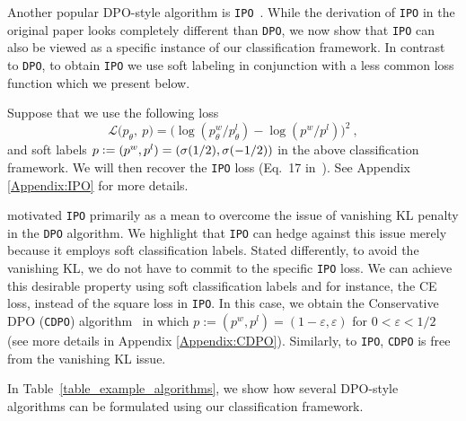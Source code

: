 Another popular DPO-style algorithm is \texttt{IPO}~\cite{IPO}. While the derivation of \texttt{IPO} in the original paper looks completely different than \texttt{DPO}, we now show that \texttt{IPO} can also be viewed as a specific instance of our classification framework. In contrast to \texttt{DPO}, to obtain \texttt{IPO} we use soft labeling in conjunction with a less common loss function which we present below.

\begin{remark}
Suppose that we use the following loss
%
\begin{equation} \label{IPOloss}
    \mathcal{L}\big(p_{\theta},\ p\big) = \big(\log (p^{w}_{\theta}/p^{l}_{\theta}) - \log (p^{w}/p^{l})\big)^2\ ,
\end{equation}
%
and soft labels $p \mathrel{\mathop:}= (p^{w}, p^{l}) = (\sigma(1/2) , \sigma(-1/2))$ in the above classification framework. We will then recover the \texttt{IPO} loss (Eq.~17 in~\citealt{IPO}). See Appendix \ref{Appendix:IPO} for more details.
\end{remark}

\citet{IPO} motivated \texttt{IPO} primarily as a mean to overcome the issue of vanishing KL penalty in the \texttt{DPO} algorithm. We highlight that \texttt{IPO} can hedge against this issue merely because it employs soft classification labels. Stated differently, to avoid the vanishing KL, we do not have to commit to the specific \texttt{IPO} loss. We can achieve this desirable property using soft classification labels and for instance, the CE loss, instead of the square loss in \texttt{IPO}. In this case, we obtain the Conservative DPO (\texttt{CDPO}) algorithm~\cite{CDPO} in which $p := (p^w,p^l) = (1-\varepsilon,\varepsilon)$ for $0 < \varepsilon < 1/2$ (see more details in Appendix \ref{Appendix:CDPO}). Similarly, to \texttt{IPO}, \texttt{CDPO} is free from the vanishing KL issue.

In Table~\ref{table_example_algorithms}, we show how several DPO-style algorithms can be formulated using our classification framework. 

